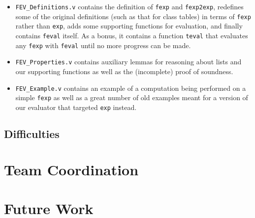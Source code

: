 \documentclass{article}
\begin{document}
\begin{itemize}
	\item \texttt{FEV\_Definitions.v} contains the definition of \texttt{fexp} and \texttt{fexp2exp}, redefines some of the original definitions (such as that for class tables) in terms of \texttt{fexp} rather than \texttt{exp}, adds some supporting functions for evaluation, and finally contains \texttt{feval} itself. As a bonus, it contains a function \texttt{teval} that evaluates any \texttt{fexp} with \texttt{feval} until no more progress can be made.
	
	\item \texttt{FEV\_Properties.v} contains auxiliary lemmas for reasoning about lists and our supporting functions as well as the (incomplete) proof of soundness.
	
	\item \texttt{FEV\_Example.v} contains an example of a computation being performed on a simple \texttt{fexp} as well as a great number of old examples meant for a version of our evaluator that targeted \texttt{exp} instead.
\end{itemize}

\subsection{Difficulties}

\section{Team Coordination}

\section{Future Work}

{}

\end{document}
